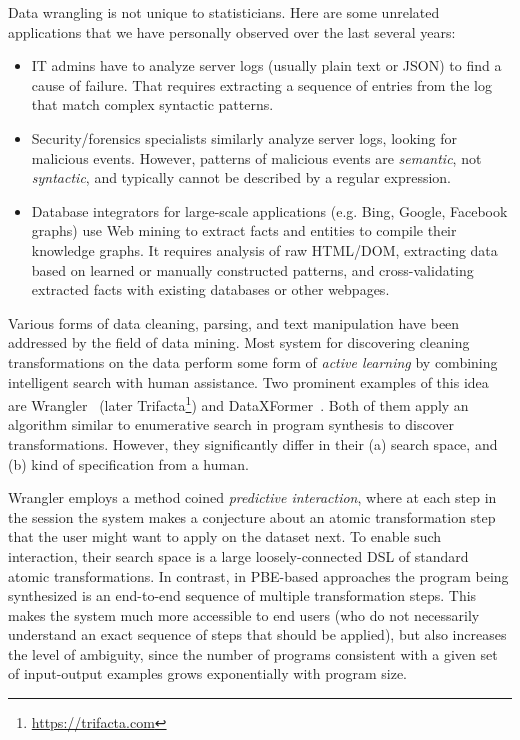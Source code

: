 Data wrangling is not unique to statisticians.
Here are some unrelated applications that we have personally observed over the last several years:
\begin{itemize}[nosep]
    \item IT admins have to analyze server logs (usually plain text or JSON) to find a cause of failure.
        That requires extracting a sequence of entries from the log that match complex syntactic patterns.
    \item Security/forensics specialists similarly analyze server logs, looking for malicious events.
        However, patterns of malicious events are \emph{semantic}, not \emph{syntactic}, and typically cannot be
        described by a regular expression.
    \item Database integrators for large-scale applications (e.g.
        Bing, Google, Facebook graphs) use Web mining to extract facts and entities to compile their knowledge graphs.
        It requires analysis of raw HTML/DOM, extracting data based on learned or manually constructed patterns, and
        cross-validating extracted facts with existing databases or other webpages.
\end{itemize}

Various forms of data cleaning, parsing, and text manipulation have been addressed by the field of data mining.
Most system for discovering cleaning transformations on the data perform some form of \emph{active learning} by
combining intelligent search with human assistance.
Two prominent examples of this idea are Wrangler~\cite{wrangler} (later Trifacta\footnote{\url{https://trifacta.com}})
and DataXFormer~\cite{dataxformer}.
Both of them apply an algorithm similar to enumerative search in program synthesis to discover transformations.
However, they significantly differ in their (a) search space, and (b) kind of specification from a human.

Wrangler employs a method coined \emph{predictive interaction}, where at each step in the session the system makes a
conjecture about an atomic transformation step that the user might want to apply on the dataset next.
To enable such interaction, their search space is a large loosely-connected DSL of standard atomic transformations.
In contrast, in PBE-based approaches the program being synthesized is an end-to-end sequence of multiple transformation
steps.
This makes the system much more accessible to end users (who do not necessarily understand an exact sequence of steps
that should be applied), but also increases the level of ambiguity, since the number of programs consistent with a given
set of input-output examples grows exponentially with program size.

